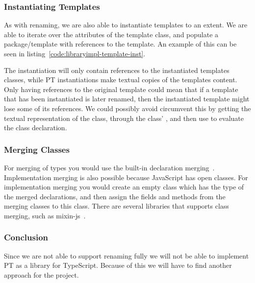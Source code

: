 \subsubsection{Instantiating Templates}\label{subsubsec:instantiating-templates}

As with renaming, we are also able to instantiate templates to an extent.
We are able to iterate over the attributes of the template class, and populate a package/template with references to the template.
An example of this can be seen in listing~\vref{code:libraryimpl-template-inst}.


The instantiation will only contain references to the instantiated templates classes, while PT instantiations make textual copies of the templates content.
Only having references to the original template could mean that if a template that has been instantiated is later renamed, then the instantiated template might lose some of its references.
We could possibly avoid circumvent this by getting the textual representation of the class, through the class' , and then use  to evaluate the class declaration.

\subsubsection{Merging Classes}

For merging of types you would use the built-in declaration merging~\cite{declerationmerging}.
Implementation merging is also possible because JavaScript has open classes.
For implementation merging you would create an empty class which has the type of the merged declarations, and then assign the fields and methods from the merging classes to this class.
There are several libraries that supports class merging, such as mixin-js~\cite{mixinjs}.

\subsubsection{Conclusion}

Since we are not able to support renaming fully we will not be able to implement PT as a library for TypeScript.
Because of this we will have to find another approach for the project.
